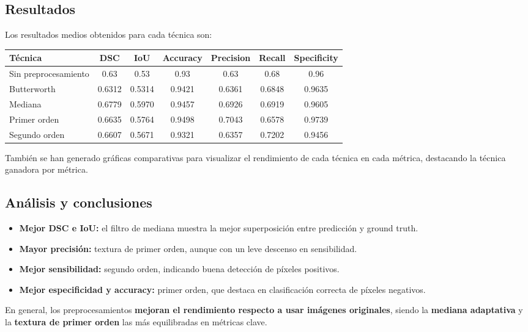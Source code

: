 \documentclass[12pt]{article}
\begin{document}
\subsection{Resultados}
Los resultados medios obtenidos para cada técnica son:

\begin{center}
\begin{tabular}{|l|c|c|c|c|c|c|}
\hline
\textbf{Técnica} & \textbf{DSC} & \textbf{IoU} & \textbf{Accuracy} & \textbf{Precision} & \textbf{Recall} & \textbf{Specificity} \\
\hline
Sin preprocesamiento & 0.63  & 0.53  & 0.93     & 0.63      & 0.68   & 0.96        \\
Butterworth          & 0.6312& 0.5314& 0.9421   & 0.6361    & 0.6848 & 0.9635      \\
Mediana              & 0.6779& 0.5970& 0.9457   & 0.6926    & 0.6919 & 0.9605      \\
Primer orden         & 0.6635& 0.5764& 0.9498   & 0.7043    & 0.6578 & 0.9739      \\
Segundo orden        & 0.6607& 0.5671& 0.9321   & 0.6357    & 0.7202 & 0.9456      \\
\hline
\end{tabular}
\end{center}

También se han generado gráficas comparativas para visualizar el rendimiento de cada técnica en cada métrica, destacando la técnica ganadora por métrica.

\subsection{Análisis y conclusiones}
\begin{itemize}
    \item \textbf{Mejor DSC e IoU:} el filtro de mediana muestra la mejor superposición entre predicción y ground truth.
    \item \textbf{Mayor precisión:} textura de primer orden, aunque con un leve descenso en sensibilidad.
    \item \textbf{Mejor sensibilidad:} segundo orden, indicando buena detección de píxeles positivos.
    \item \textbf{Mejor especificidad y accuracy:} primer orden, que destaca en clasificación correcta de píxeles negativos.
\end{itemize}

En general, los preprocesamientos \textbf{mejoran el rendimiento respecto a usar imágenes originales}, siendo la \textbf{mediana adaptativa} y la \textbf{textura de primer orden} las más equilibradas en métricas clave.
\end{document}
